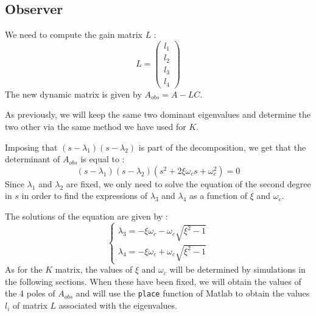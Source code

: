 \subsection{Observer}
We need to compute the gain matrix $L$ :
$$
L = \begin{pmatrix}
    l_1\\
    l_2\\
    l_3\\
    l_4
\end{pmatrix}
$$
The new dynamic matrix is given by $A_{obs} = A - LC$.\par
As previously, we will keep the same two dominant eigenvalues and determine the two other via the same method we have used for $K$.\par
Imposing that $(s - \lambda_1)(s - \lambda_2)$ is part of the decomposition, we get that the determinant of $A_{obs}$ is equal to :
$$
(s - \lambda_1)(s - \lambda_2)(s^2 + 2 \xi\omega_c s + \omega_c^2) = 0
$$
Since $\lambda_1$ and $\lambda_2$ are fixed, we only need to solve the equation of the second degree in $s$ in order to find the expressions of $\lambda_3$ and $\lambda_4$ as a function of $\xi$ and $\omega_c$.\par
The solutions of the equation are given by :
$$
\begin{cases}
    \lambda_3 = -\xi\omega_c - \omega_c\sqrt{\xi^2 - 1}\\
    \lambda_4 = -\xi\omega_c + \omega_c\sqrt{\xi^2 - 1}
\end{cases}
$$
As for the $K$ matrix, the values of $\xi$ and $\omega_c$ will be determined by simulations in the following sections. When these have been fixed, we will obtain the values of the 4 poles of $A_{obs}$ and will use the \texttt{place} function of Matlab to obtain the values $l_i$ of matrix $L$ associated with the eigenvalues.
